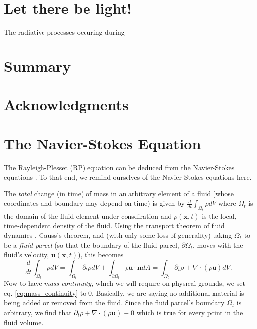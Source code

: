 \documentclass[rmp,aps,nofootinbib,superscriptaddress,floatfix]{revtex4-2}
\begin{document}
\section{Let there be light!}
The radiative processes occuring during \cite{hilgenfeldt1999simple}

\section{Summary}

\section{Acknowledgments}

\appendix

\section{The Navier-Stokes Equation}
The Rayleigh-Plesset (RP) equation can be deduced from the Navier-Stokes equations \cite{prosperetti1999old,brenner2002single,prosperetti1986bubble,plesset1977bubble,suslick2008inside,yasui2018acoustic}. To that end, we remind ourselves of the Navier-Stokes equations here. 

The \emph{total} change (in time) of mass in an arbitrary element of a fluid (whose coordinates and boundary may depend on time) is given by  $\frac{d}{dt} \int_{\Omega_t} \rho dV$ where $\Omega_t$ is the domain of the fluid element under consdiration and $\rho(\bm{x},t)$ is the local, time-dependent density of the fluid. Using the transport theorem of fluid dynamics \cite{mcdonough2009lectures}, Gauss's theorem, and (with only some loss of generality) taking $\Omega_t$ to be a \emph{fluid parcel} (so that the boundary of the fluid parcel, $\partial \Omega_t$, moves with the fluid's velocity, $\bm{u}(\bm{x},t)$), this becomes
\begin{equation}
    \frac{d}{dt} \int_{\Omega_t} \rho dV = \int_{\Omega_t} \partial_t \rho dV+\int_{\partial \Omega_t} \rho \bm{u} \cdot \bm{n} dA = \int_{\Omega_t} \partial_t \rho+\nabla \cdot(\rho \bm{u})dV.
    \label{eq:mass_continuity}
\end{equation}
Now to have \emph{mass-continuity}, which we will require on physical grounds, we set eq. \ref{eq:mass_continuity} to 0. Basically, we are saying no additional material is being added or removed from the fluid. Since the fluid parcel's boundary $\Omega_t$ is arbitrary, we find that $\partial_t \rho+\nabla\cdot(\rho \bm{u})\equiv 0$ which is true for every point in the fluid volume.
\end{document}
